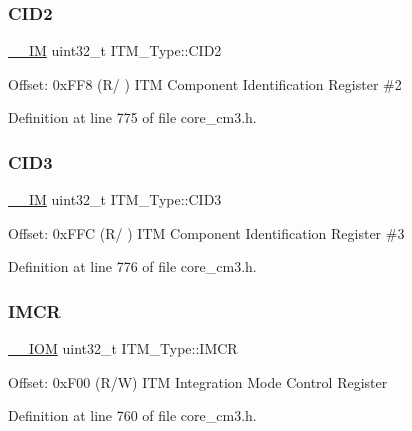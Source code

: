 \subsubsection{\texorpdfstring{C\+I\+D2}{CID2}}
{\footnotesize\ttfamily \hyperlink{core__sc300_8h_a4cc1649793116d7c2d8afce7a4ffce43}{\+\_\+\+\_\+\+IM} uint32\+\_\+t I\+T\+M\+\_\+\+Type\+::\+C\+I\+D2}

Offset\+: 0x\+F\+F8 (R/ ) I\+TM Component Identification Register \#2 

Definition at line 775 of file core\+\_\+cm3.\+h.

\mbox{\label{struct_i_t_m___type_a43451f43f514108d9eaed5b017f8d921}} 
\subsubsection{\texorpdfstring{C\+I\+D3}{CID3}}
{\footnotesize\ttfamily \hyperlink{core__sc300_8h_a4cc1649793116d7c2d8afce7a4ffce43}{\+\_\+\+\_\+\+IM} uint32\+\_\+t I\+T\+M\+\_\+\+Type\+::\+C\+I\+D3}

Offset\+: 0x\+F\+FC (R/ ) I\+TM Component Identification Register \#3 

Definition at line 776 of file core\+\_\+cm3.\+h.

\mbox{\label{struct_i_t_m___type_ae2ce4d3a54df2fd11a197ccac4406cd0}} 
\subsubsection{\texorpdfstring{I\+M\+CR}{IMCR}}
{\footnotesize\ttfamily \hyperlink{core__sc300_8h_ab6caba5853a60a17e8e04499b52bf691}{\+\_\+\+\_\+\+I\+OM} uint32\+\_\+t I\+T\+M\+\_\+\+Type\+::\+I\+M\+CR}

Offset\+: 0x\+F00 (R/W) I\+TM Integration Mode Control Register 

Definition at line 760 of file core\+\_\+cm3.\+h.

\mbox{\label{struct_i_t_m___type_a66eb82a070953f09909f39b8e516fb91}} 
